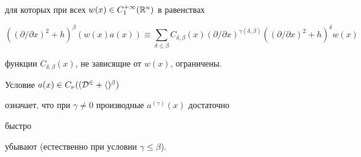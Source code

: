 для которых при всех $w(x)\in C^{+\infty}_1(\Bbb R^n)$ в равенствах 


$$ 


((\partial/\partial x)^2+h)^\beta(w(x)a(x))\equiv 


\sum_{\delta\le\beta}C_{\delta,\beta}(x) 


(\partial/\partial x)^{\gamma(\delta,\beta)} 


((\partial/\partial x)^2+h)^\delta w(x) 


$$ 


функции $C_{\delta,\beta}(x)$, не зависящие от $w(x)$, ограничены. 


Условие $a(x)\in C_\nu((\cal D^2+h)^\beta)$ 


означает, что при $\gamma\ne0$ производные $a^{(\gamma)}(x)$ достаточно 


быстро 


убывают (естественно при условии $\gamma\le\beta$). 


 


